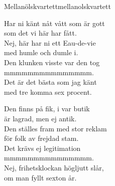 \begin{song}{Mellanölskvartett}{mellanolskvartett}
\begin{vers}
Har ni känt nåt vått som är gott\\
som det vi här har fått.\\
Nej, här har ni ett Eau-de-vie\\
med humle och dumle i.\\
Den klunken visste var den tog\\
mmmmmmmmmmmmmmm.\\
Det är det bästa som jag känt\\
med tre komma sex procent.\\
\end{vers}
\begin{vers}
Den finns på fik, i var butik\\
är lagrad, men ej antik.\\
Den ställes fram med stor reklam\\
för folk av frejdad stam.\\
Det krävs ej legitimation\\
mmmmmmmmmmmmmmm.\\
Nej, frihetsklockan högljutt slår,\\
om man fyllt sexton år.\\
\end{vers}
\end{song}





















